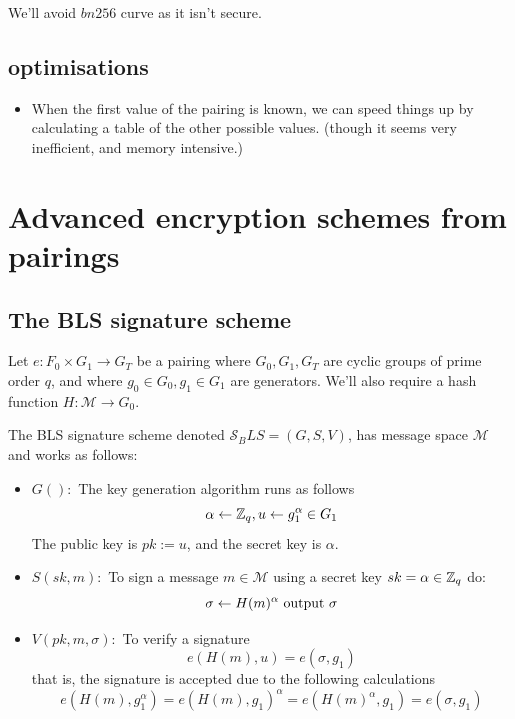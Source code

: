 We'll avoid $bn256$ curve as it isn't secure.


\subsection*{optimisations}
\begin{itemize}
  \item When the first value of the pairing is known, we can speed things up
  by calculating a table of the other possible values. (though it seems very inefficient, and memory intensive.)
\end{itemize}

\section{Advanced encryption schemes from pairings}

\subsection{The BLS signature scheme}
Let $e:F_0 \times G_1 \to G_T$ be a pairing where $G_0,G_1,G_T$ are
cyclic groups of prime order $q$, and where $g_0\in G_0, g_1\in G_1$ are
generators. 
We'll also require a hash function $H : \mathcal{M} \to G_0$.

The BLS signature scheme denoted $\mathcal{S}_BLS = (G,S,V)$, has message space
$\mathcal{M}$ and works as follows:
\begin{itemize}
  \item $G():$ The key generation algorithm runs as follows 
  $$  \alpha \leftarrow \mathbb{Z}_q,u\leftarrow g_1^\alpha \in G_1  $$
  The public key is $ pk := u$, and the secret key is $\alpha$.

  \item $S(sk,m):$ To sign a message $m\in \mathcal{M}$ using a secret key
  $sk=\alpha\in\mathbb{Z}_q$ do:
  $$ \sigma\leftarrow H(m)^{\alpha} \text{ output } \sigma$$

  \item $V(pk,m,\sigma):$ To verify a signature 
  $$ e(H(m), u) = e(\sigma,g_1) $$
  that is, the signature is accepted due to the following calculations
  $$e(H(m), g_1^\alpha) = e(H(m),g_1)^\alpha = e(H(m)^\alpha,g_1)= 
  e(\sigma, g_1)
  $$
\end{itemize}

